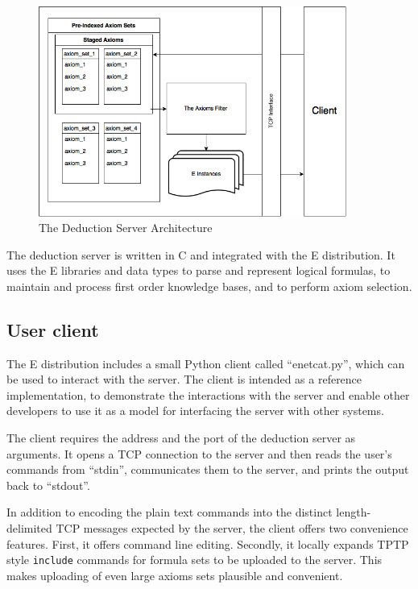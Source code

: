 \documentclass{article}
\begin{document}
\begin{figure}[t]
  \centering
  \includegraphics[width=0.9\textwidth]{imgs/TheDeductionServer.png}
  \caption{The Deduction Server Architecture\label{deduction_server_figure}}
\end{figure}

The deduction server is written in C and integrated with the E
distribution. It uses the E libraries and data types to parse and
represent logical formulas, to maintain and process first order
knowledge bases, and to perform axiom selection.


\subsection{User client}

The E distribution includes a small Python client called
``enetcat.py'', which can be used to interact with the server. The
client is intended as a reference implementation, to demonstrate the
interactions with the server and enable other developers to use it as
a model for interfacing the server with other systems.

The client requires the address and the port of the deduction server
as arguments. It opens a TCP connection to the server and then reads
the user's commands from ``stdin'', communicates them to the server,
and prints the output back to ``stdout''.

In addition to encoding the plain text commands into the distinct
length-delimited TCP messages expected by the server, the client
offers two convenience features. First, it offers command line
editing. Secondly, it locally expands TPTP style \texttt{include}
commands for formula sets to be uploaded to the server. This makes
uploading of even large axioms sets plausible and convenient.
\end{document}
